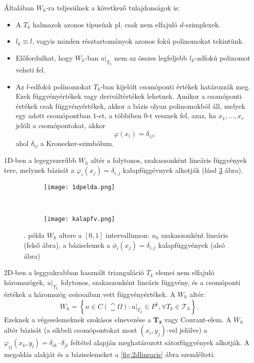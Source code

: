 Általában $W_h$-ra teljesülnek a következő tulajdonságok is:
\begin{itemize}
	\item A $T_k$ halmazok azonos típusúak pl. csak nem elfajuló $d$-szimplexek.
	\item $l_k \equiv l$, vagyis minden résztartományok azonos fokú polinomokat tekintünk.
	\item Előfordulhat, hogy $W_h$-ban $u|_{T_k}$ nem az összes legfeljebb $l_k$-adfokú polinomot veheti fel.
	\item Az $l$-edfokú polinomokat $T_k$-ban kijelölt csomóponti értékek határozzák meg. Ezek függvényértékek vagy deriváltértékek lehetnek. Amikor a csomóponti értékek csak függvényértékek, akkor a bázis olyan polinomokból áll, melyek egy adott csomópontban $1$-et, a többiben $0$-t vesznek fel, azaz, ha $x_1, \ldots, x_r$ jelöli a csomópontokat, akkor 
		\begin{equation*}
			\varphi(x_i) = \delta_{ij},
		\end{equation*}
		ahol $\delta_{ij}$ a Kronecker-szimbólum.
\end{itemize}


\begin{example}\label{1dpelda}
	1D-ben a legegyszerűbb $W_h$ altér a folytonos, szakaszonként lineáris függvények tere, melynek bázisát a $\varphi_i(x_j) = \delta_{i,j}$ kalapfüggévnyek alkotják (lásd \ref{fig:1dlinearis} ábra).
\end{example}

\begin{figure}[h!]
	\begin{subfigure}{\textwidth}
		\centerline{\texttt{[image: 1dpelda.png]}}
		\label{fig:linu1d}
	\end{subfigure}\\
	\begin{subfigure}{\textwidth}
		\centerline{\texttt{[image: kalapfv.png]}}
		\label{fig:sator1d}
	\end{subfigure}
	\caption{. példa $W_h$ altere a $[0,1]$ intervallumon: $u_h$ szakaszonként lineáris (felső ábra), a báziselemek a $\phi_i(x_j) = \delta_{i,j}$ kalapfüggvények (alsó ábra)}
	\label{fig:1dlinearis}
\end{figure}
	
\begin{example}\label{2dpelda}
	2D-ben a leggyakrabban használt trianguláció $T_k$ elemei nem elfajuló háromszögek, $u|_{T_k}$ folytonos, szakaszonként lineáris függvény, és a csomóponti értékek a háromszög csúcsaiban vett függvényértékek. A $W_h$ altér:
	\begin{equation*}
		W_h = \left\{ u \in C(\closure{\Omega}): u|_{T_k} \in P^1, \forall T_k \in \mathcal{T}_h  \right\}.
	\end{equation*}
	Ezeknek a végeselemeknek szokásos elnevezése a $\mathbf{T_3}$ vagy Courant-elem. A $W_h$ altér bázisát (a síkbeli csomópontokat most $(x_i,y_j)$-vel jelölve) a $\varphi_{ij}(x_k,y_l) = \delta_{ik} \cdot \delta_{jl}$ feltétel alapján meghatározott sátorfüggvények alkotják.  A megoldás alakját és a báziselemeket a  \ref{fig:2dlinearis} ábra szemlélteti.
\end{example}

